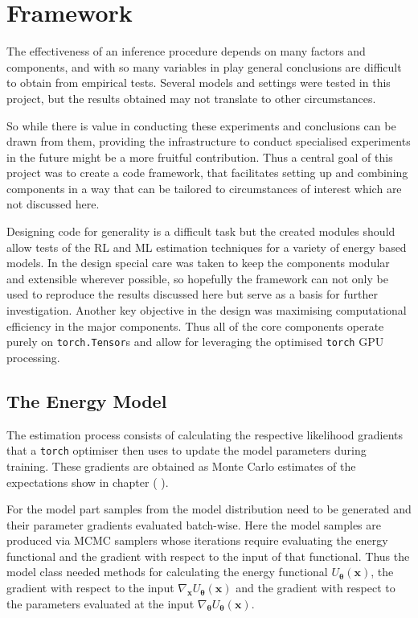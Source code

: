 
\section{Framework}

The effectiveness of an inference procedure depends on many factors and components, 
and with so many variables in play general conclusions are difficult to obtain from empirical tests.
Several models and settings were tested in this project, but the results obtained may not translate to other circumstances.

So while there is value in conducting these experiments and conclusions can be drawn from them, 
providing the infrastructure to conduct specialised experiments in the future might be a more fruitful contribution.
Thus a central goal of this project was to create a code framework, 
that facilitates setting up and combining components in a way that can be tailored to circumstances of interest which are not discussed here.

Designing code for generality is a difficult task but the created modules should allow tests of the RL and ML estimation techniques for a variety of energy based models.
In the design special care was taken to keep the components modular and extensible wherever possible, 
so hopefully the framework can not only be used to reproduce the results discussed here but serve as a basis for further investigation.
Another key objective in the design was maximising computational efficiency in the major components.
Thus all of the core components operate purely on \texttt{torch.Tensor}s and allow for leveraging the optimised \texttt{torch} GPU processing.


\subsection{The Energy Model}

The estimation process consists of calculating the respective likelihood gradients that a \texttt{torch} optimiser then uses to update the model parameters during training.
These gradients are obtained as Monte Carlo estimates of the expectations show in chapter ( ).

For the model part samples from the model distribution need to be generated and their parameter gradients evaluated batch-wise.
Here the model samples are produced via MCMC samplers whose iterations require evaluating the energy functional and the gradient with respect to the input of that functional.
Thus the model class needed methods for calculating the energy functional $U_{\bm{\theta}} (\bm{x})$, 
the gradient with respect to the input $\nabla_{\bm{x}} U_{\bm{\theta}} (\bm{x})$ 
and the gradient with respect to the parameters evaluated at the input $\nabla_{\bm{\theta}} U_{\bm{\theta}} (\bm{x})$.

